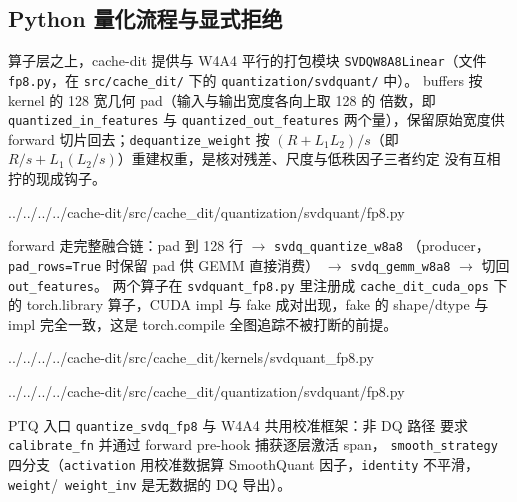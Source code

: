 \subsection{Python 量化流程与显式拒绝}\label{sec:40b-python}

算子层之上，cache-dit 提供与 W4A4 平行的打包模块
\texttt{SVDQW8A8Linear}（文件 \texttt{fp8.py}，在
\texttt{src/cache\_dit/} 下的 \texttt{quantization/svdquant/} 中）。
buffers 按 kernel 的 128 宽几何 pad（输入与输出宽度各向上取 128 的
倍数，即 \texttt{quantized\_in\_features} 与
\texttt{quantized\_out\_features} 两个量），保留原始宽度供 forward
切片回去；\texttt{dequantize\_weight} 按 $(R+L_1L_2)/s$（即
$R/s+L_1(L_2/s)$）重建权重，是核对残差、尺度与低秩因子三者约定
没有互相拧的现成钩子。

\begin{lstinputlisting}[linerange={139-147},firstnumber=auto,
  title={fp8.py L139--147（残差 per-row 量化与 proj\_down 折逆平滑）}]{../../../../cache-dit/src/cache_dit/quantization/svdquant/fp8.py}
\end{lstinputlisting}

forward 走完整融合链：pad 到 128 行 $\to$ \texttt{svdq\_quantize\_w8a8}
（producer，\texttt{pad\_rows=True} 时保留 pad 供 GEMM 直接消费）
$\to$ \texttt{svdq\_gemm\_w8a8} $\to$ 切回 \texttt{out\_features}。
两个算子在 \texttt{svdquant\_fp8.py} 里注册成
\texttt{cache\_dit\_cuda\_ops} 下的 torch.library 算子，CUDA impl 与
fake 成对出现，fake 的 shape/dtype 与 impl 完全一致，这是
torch.compile 全图追踪不被打断的前提。

\begin{lstinputlisting}[linerange={48-71},firstnumber=auto,
  title={svdquant\_fp8.py L48--71（GEMM 算子的 define / CUDA impl / register\_fake）}]{../../../../cache-dit/src/cache_dit/kernels/svdquant_fp8.py}
\end{lstinputlisting}

\begin{lstinputlisting}[linerange={178-204},firstnumber=auto,
  title={fp8.py L178--204（SVDQW8A8Linear.forward：pad、融合 producer+GEMM、切片返回）}]{../../../../cache-dit/src/cache_dit/quantization/svdquant/fp8.py}
\end{lstinputlisting}

PTQ 入口 \texttt{quantize\_svdq\_fp8} 与 W4A4 共用校准框架：非 DQ 路径
要求 \texttt{calibrate\_fn} 并通过 forward pre-hook 捕获逐层激活 span，
\texttt{smooth\_strategy} 四分支（\texttt{activation} 用校准数据算
SmoothQuant 因子，\texttt{identity} 不平滑，\texttt{weight}/\texttt{
weight\_inv} 是无数据的 DQ 导出）。

